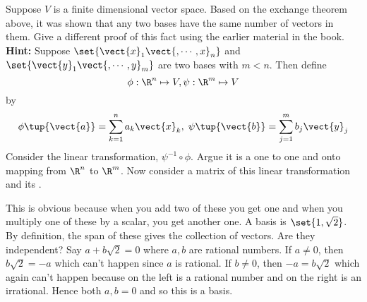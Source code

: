 \begin{enumialphparenastyle}
\begin{ex} Suppose $V$ is a finite dimensional vector space. Based on the
exchange theorem above, it was shown that any two bases have the same number
of vectors in them. Give a different proof of this fact using the earlier
material in the book. \textbf{Hint: }Suppose $\set{\vect{x}_{1}\vect{
,\cdots ,x}_{n}} $ and $\set{\vect{y}_{1}\vect{,\cdots ,y}
_{m}} $ are two bases with $m<n$. Then define 
\begin{equation*}
\phi :\R^{n}\mapsto V,\psi :\R^{m}\mapsto V
\end{equation*}
by 
\begin{equation*}
\phi \tup{\vect{a}} = \sum_{k=1}^{n}a_{k}\vect{x}
_{k},\;\psi \tup{\vect{b}} = \sum_{j=1}^{m}b_{j}\vect{y}_{j}
\end{equation*}
Consider the linear transformation, $\psi ^{-1}\circ \phi$. Argue it is a
one to one and onto mapping from $\R^{n}$ to $\R^{m}$. Now
consider a matrix of this linear transformation and its {\rref}.
\begin{sol}
This is obvious because
when you add two of these you get one and when you multiply one of these by
a scalar, you get another one. A basis is $\set{1,\sqrt{2}}$. By
definition, the span of these gives the collection of vectors. Are they
independent? Say $a+b\sqrt{2}=0$ where $a,b$ are rational numbers. If $a\neq
0$, then $b\sqrt{2}=-a$ which can't happen since $a$ is rational. If $b\neq
0$, then $-a=b\sqrt{2}$ which again can't happen because on the left is a
rational number and on the right is an irrational. Hence both $a,b=0$ and so
this is a basis.
\end{sol}
\end{ex}

\end{enumialphparenastyle}

